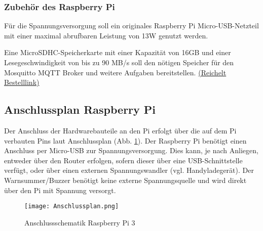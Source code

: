 \subsubsection{Zubehör des Raspberry Pi}
Für die Spannungsversorgung soll ein originales Raspberry Pi Micro-USB-Netzteil mit einer maximal abrufbaren Leistung von 13W genutzt werden.\par

Eine MicroSDHC-Speicherkarte mit einer Kapazität von 16GB und einer Lesegeschwindigkeit von bis zu 90 MB/s soll den nötigen Speicher für den Mosquitto MQTT Broker und weitere Aufgaben bereitstellen. \href{\linkmicrosd}{(Reichelt Bestelllink)} 

\newpage

\subsection{Anschlussplan Raspberry Pi}
Der Anschluss der Hardwarebauteile an den Pi erfolgt über die auf dem Pi verbauten Pins laut Anschlussplan (Abb. \ref{Anschlussplan}). Der Raspberry Pi benötigt einen Anschluss per Micro-USB zur Spannungsversorgung. Dies kann, je nach Anliegen, entweder über den Router erfolgen, sofern dieser über eine USB-Schnittstelle verfügt, oder über einen externen Spannungswandler (vgl. Handyladegerät). Der Warnsummer/Buzzer benötigt keine externe Spannungsquelle und wird direkt über den Pi mit Spannung versorgt.

\begin{figure}[H]	%
\begin{center}
\texttt{[image: Anschlussplan.png]}
\caption{Anschlussschematik Raspberry Pi 3}
\label{Anschlussplan}
\end{center}
\end{figure}
